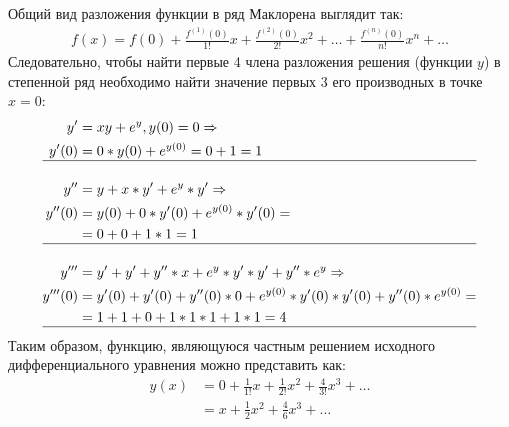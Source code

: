 \documentclass[12pt, a4paper]{article}
\begin{document}
Общий вид разложения функции в ряд Маклорена выглядит так:
\begin{equation*}
\begin{aligned}
f(x) = f(0) + \frac{f^{(1)}(0)}{1!}x + \frac{f^{(2)}(0)}{2!}x^2 + \ldots + \frac{f^{(n)}(0)}{n!}x^n + \ldots
\end{aligned}
\end{equation*}
Следовательно, чтобы найти первые 4 члена разложения решения (функции $y$) в степенной ряд необходимо найти значение первых 3 его производных в точке $x=0$:
\begin{equation*}
\begin{aligned}
y'&=xy+e^y, y(0)=0 \Rightarrow\\
y'(0) &= 0 * y(0) + e^{y(0)} = 0 + 1 = 1\\
\hline\\
y''&= y + x*y' + e^y * y' \Rightarrow\\
y''(0)&= y(0) + 0*y'(0) + e^{y(0)} * y'(0) =\\
&= 0 + 0 + 1 * 1 = 1\\
\hline\\
y'''&= y' + y' + y''*x + e^y * y' * y' + y'' * e^y \Rightarrow\\
y'''(0)&= y'(0) + y'(0) + y''(0)*0 + e^{y(0)} * y'(0) * y'(0) + y''(0) * e^{y(0)} =\\
&= 1 + 1 + 0 + 1*1*1+1*1 = 4\\
\hline
\end{aligned}
\end{equation*}
Таким образом, функцию, являющуюся частным решением исходного дифференциального уравнения можно представить как:
\begin{equation*}
\begin{aligned}
y(x) &= 0 + \frac{1}{1!}x+\frac{1}{2!}x^2 + \frac{4}{3!}x^3 + \ldots\\
&= x + \frac{1}{2}x^2+\frac{4}{6}x^3 + \ldots
\end{aligned}
\end{equation*}
\end{document}

